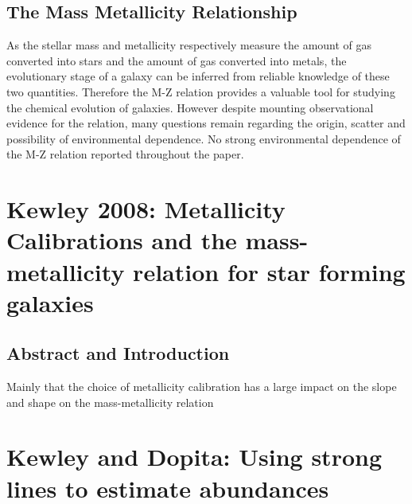 \documentclass{literature}
\begin{document}
\subsection{The Mass Metallicity Relationship}
As the stellar mass and metallicity respectively measure the amount of gas converted into stars and the amount of gas converted into metals, the evolutionary stage of a galaxy can be inferred from reliable knowledge of these two quantities. Therefore the M-Z relation provides a valuable tool for studying the chemical evolution of galaxies. However despite mounting observational evidence for the relation, many questions remain regarding the origin, scatter and possibility of environmental dependence. No strong environmental dependence of the M-Z relation reported throughout the paper.


\section{Kewley 2008: Metallicity Calibrations and the mass-metallicity relation for star forming galaxies}\label{sec:K08}
\subsection{Abstract and Introduction}
Mainly that the choice of metallicity calibration has a large impact on the slope and shape on the mass-metallicity relation



\section{Kewley and Dopita: Using strong lines to estimate abundances}\label{sec:Kewley_Dopita}
\end{document}
